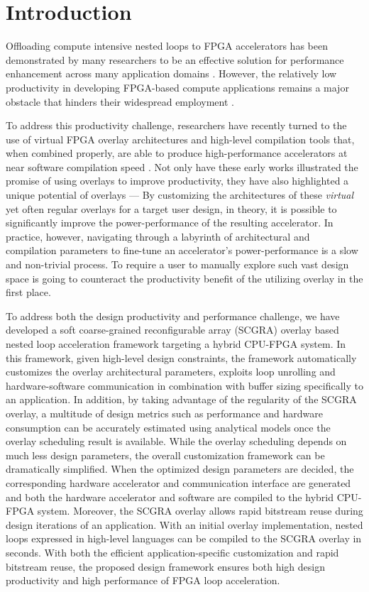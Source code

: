 \section{Introduction}
Offloading compute intensive nested loops to FPGA accelerators has 
been demonstrated by many researchers to be an effective solution 
for performance enhancement across many application domains \cite{Chung2010}. 
However, the relatively low productivity in developing FPGA-based 
compute applications remains a major obstacle that hinders 
their widespread employment \cite{cong2011high}.

To address this productivity challenge, researchers have recently 
turned to the use of virtual FPGA overlay architectures and 
high-level compilation tools that, when combined properly, 
are able to produce high-performance accelerators at near
software compilation speed \cite{Grant2011Malibu, ZUMA2012, 
mesh-FUs, ferreira2011fpga, kissler2006dynamically, scgra}.
Not only have these early works illustrated the promise of using overlays 
to improve productivity, they have also highlighted a unique potential 
of overlays --- By customizing the architectures of these \emph{virtual} 
yet often regular overlays for a target user design, in theory, it is 
possible to significantly improve the power-performance of the 
resulting accelerator. In practice, however, navigating through a 
labyrinth of architectural and compilation parameters to fine-tune 
an accelerator's power-performance is a slow and non-trivial process. 
To require a user to manually explore such vast design space is going 
to counteract the productivity benefit of the utilizing overlay 
in the first place.

To address both the design productivity and performance challenge, 
we have developed a soft coarse-grained reconfigurable array (SCGRA) overlay based 
nested loop acceleration framework targeting a hybrid CPU-FPGA system.
In this framework, given high-level design constraints, the framework automatically  
customizes the overlay architectural parameters, exploits loop unrolling 
and hardware-software communication in combination 
with buffer sizing specifically to an application.  
In addition, by taking advantage of the regularity of the SCGRA overlay, 
a multitude of design metrics such as performance and hardware consumption can 
be accurately estimated using analytical models once the overlay scheduling 
result is available. While the overlay scheduling depends on much less design 
parameters, the overall customization framework can be dramatically simplified.
When the optimized design parameters are decided, the 
corresponding hardware accelerator and communication interface 
are generated and both the hardware accelerator and software 
are compiled to the hybrid CPU-FPGA system.
Moreover, the SCGRA overlay allows rapid bitstream reuse \cite{scgra} during 
design iterations of an application. With an initial overlay implementation, 
nested loops expressed in high-level languages can be compiled to the SCGRA overlay in seconds. 
With both the efficient application-specific customization and rapid bitstream reuse,   
the proposed design framework ensures both high design productivity and 
high performance of FPGA loop acceleration.

